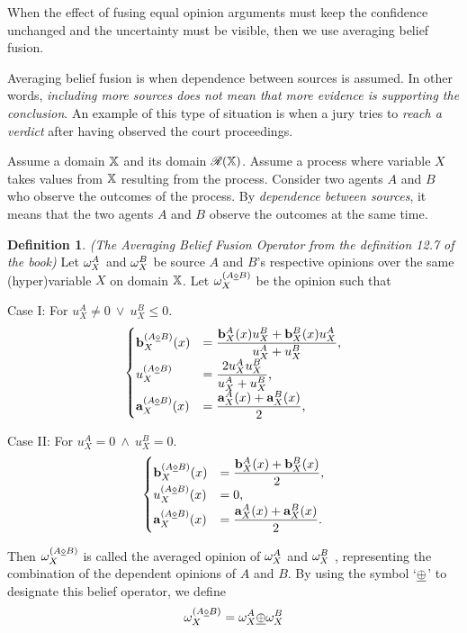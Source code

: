 \documentclass[a4paper,12pt]{article}
\theoremstyle{definition}
\newtheorem{definition}{Definition}[section]
\theoremstyle{theorem}
\numberwithin{equation}{section}
\begin{document}
When the effect of fusing equal opinion arguments must keep the confidence unchanged and the uncertainty must be visible, then we use averaging belief fusion.

Averaging belief fusion is when dependence between sources is assumed. In other words, \emph{including more sources does not mean that more evidence is supporting the conclusion}. An example of this type of situation is when a jury tries to \emph{reach a verdict} after having observed the court proceedings.

Assume a domain $\mathbb{X}$ and its domain $\mathcal{R}(\mathbb{X})$. Assume a process where variable $X$ takes values from $\mathbb{X}$ resulting from the process. Consider two agents $A$ and $B$ who observe the outcomes of the process. By \emph{dependence between sources}, it means that the two agents $A$ and $B$ observe the outcomes at the same time.

\begin{definition}
\emph{(The Averaging Belief Fusion Operator from the definition 12.7 of the book)} Let $\omega^{A}_{X}$ and $\omega^{B}_{X}$ be source $A$ and $B$’s respective opinions over the same (hyper)variable $X$ on domain $\mathbb{X}$. Let $\omega^{(A \underline{\diamond} B)}_{X}$ be the opinion such that

Case I: For $u^A_X \neq 0 \ \lor\ u^B_X \leq 0$.
\begin{equation}
\begin{cases}
\mathbf{b}^{(A \underline{\diamond} B)}_{X}(x) & = \dfrac{\mathbf{b}^{A}_{X}(x) u^B_X + \mathbf{b}^{B}_{X}(x) u^A_X}{u^A_X + u^B_X} \text{,} \\
u^{(A \underline{\diamond} B)}_X & = \dfrac{2 u^A_X u^B_X}{u^A_X + u^B_X} \text{,} \\
\mathbf{a}^{(A \underline{\diamond} B)}_{X}(x) & = \dfrac{\mathbf{a}^{A}_{X}(x) + \mathbf{a}^{B}_{X}(x)}{2} \text{,}
\end{cases}
\end{equation}

Case II: For $u^A_X = 0\ \land\ u^B_X = 0$.
\begin{equation}
\begin{cases}
\mathbf{b}^{(A \underline{\diamond} B)}_{X}(x) & = \dfrac{\mathbf{b}^{A}_{X}(x) + \mathbf{b}^{B}_{X}(x)}{2} \text{,} \\
u^{(A \underline{\diamond} B)}_X(x) & = 0 \text{,} \\
\mathbf{a}^{(A \underline{\diamond} B)}_{X}(x) & = \dfrac{\mathbf{a}^{A}_{X}(x) + \mathbf{a}^{B}_{X}(x)}{2}.
\end{cases}
\end{equation}

Then $\omega^{(A \underline{\diamond} B)}_{X}$ is called the averaged opinion of $\omega^{A}_{X}$ and $\omega^{B}_{X}$ , representing the combination of the dependent opinions of $A$ and $B$. By using the symbol `$\underline{\oplus}$' to designate this belief operator, we define
\begin{equation}
\omega^{(A \underline{\diamond} B)}_{X} = \omega^{A}_{X} \underline{\oplus} \omega^{B}_{X}
\end{equation}
\end{definition}
\end{document}
